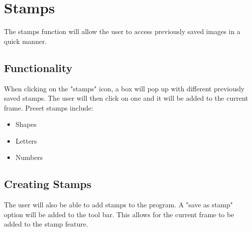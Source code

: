 \documentclass{article}
\begin{document}
	\section{Stamps}
	The stamps function will allow the user to access previously saved images in a quick manner. 

	
	\subsection{Functionality}
	When clicking on the "stamps" icon, a box will pop up with different previously saved stamps. The user       will then click on one and it will be added to the current frame. Preset stamps include:
      \begin{itemize}
        \item Shapes
        \item Letters
        \item Numbers
      \end{itemize}
   \subsection{Creating Stamps}
   The user will also be able to add stamps to the program. A "save as stamp" option will be added to the      tool bar. This allows for the current frame to be added to the stamp feature.
	
\end{document}
